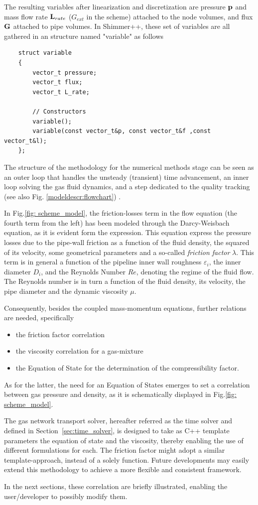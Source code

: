 The resulting variables after linearization and discretization are pressure ${\mathbf p}$ and mass flow rate ${\mathbf L}_{rate}$ ($G_{ext}$ in the scheme) attached to the node volumes, and flux ${\mathbf G}$ attached to pipe volumes. In Shimmer++, these set of variables are all gathered in an structure named "variable" as follows 
\begin{verbatim}
    struct variable
    {
        vector_t pressure;
        vector_t flux;
        vector_t L_rate;

        // Constructors
        variable();
        variable(const vector_t&p, const vector_t&f ,const vector_t&l);
    };
\end{verbatim}
The structure of the methodology for the numerical methods stage can be seen as an outer loop that handles the unsteady (transient) time advancement, an inner loop solving the gas fluid dynamics, and a step dedicated to the quality tracking (see also Fig. \ref{modeldescr:flowchart}) .

In Fig.\ref{fig: scheme_model}, the friction-losses term in the flow equation (the fourth term from the left) has been modeled through the Darcy-Weisbach equation, as it is evident form the expression. This equation express the pressure losses due to the pipe-wall friction as a function of the fluid density, the squared of its velocity, some geometrical parameters and a so-called \textit{friction factor} $\lambda$. This term is in general a function of the pipeline inner wall roughness $\varepsilon_i$, the inner diameter $D_i$, and the Reynolds Number $Re$, denoting the regime of the fluid flow. The Reynolds number is in turn a function of the fluid density, its velocity, the pipe diameter and the dynamic viscosity $\mu$.

Consequently, besides the coupled mass-momentum equations, further relations are needed, specifically
\begin{itemize}
    \item the friction factor correlation
    \item the viscosity correlation for a gas-mixture
    \item the Equation of State for the determination of the compressibility factor.
\end{itemize}
As for the latter, the need for an Equation of States emerges to set a correlation between gas pressure and density, as it is schematically displayed in Fig.\ref{fig: scheme_model}.
\begin{remark}
The gas network transport solver, hereafter referred as the time solver and defined in Section~\ref{sec:time_solver}, is designed to  take as C++ template parameters the equation of state and the viscosity, thereby enabling the use of different formulations for each. The friction factor might adopt a similar template-approach, instead of a solely function.  Future developments may easily extend this methodology to achieve a more flexible and consistent framework.    
\end{remark}
In the next sections, these correlation are briefly illustrated, enabling the user/developer to possibly modify them.

